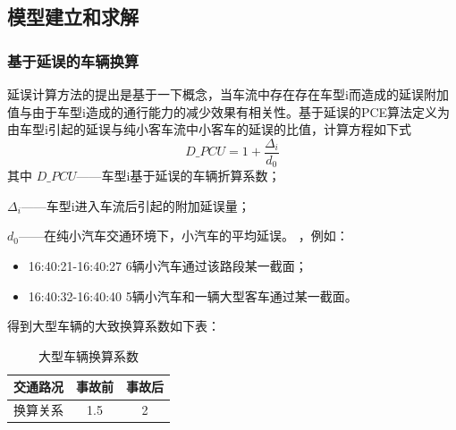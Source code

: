 \documentclass[UTF8,12.05pt]{ctexart}
\begin{document}
\subsection{模型建立和求解}
\subsubsection{基于延误的车辆换算}
延误计算方法的提出是基于一下概念，当车流中存在存在车型i而造成的延误附加值与由于车型i造成的通行能力的减少效果有相关性。基于延误的PCE算法定义为由车型i引起的延误与纯小客车流中小客车的延误的比值，计算方程如下式
$$D\_PCU=1+\frac{\Delta_{i}}{d_{0}}$$
其中 $D\_PCU$——车型i基于延误的车辆折算系数；
\par$\Delta_{i}$——车型i进入车流后引起的附加延误量；
\par$d_{0}$——在纯小汽车交通环境下，小汽车的平均延误。
，例如：
\begin{itemize}
  \item 16:40:21-16:40:27 6辆小汽车通过该路段某一截面；
  \item 16:40:32-16:40:40 5辆小汽车和一辆大型客车通过某一截面。
\end{itemize}
得到大型车辆的大致换算系数如下表：
\begin{table}[H]
  \centering
  \caption{大型车辆换算系数}
  \begin{tabular}{|c|c|c|}
    \hline
    交通路况 & 事故前 & 事故后 \\ \hline
    换算关系 & 1.5 & 2 \\
    \hline
  \end{tabular}
\end{table}
\end{document}

